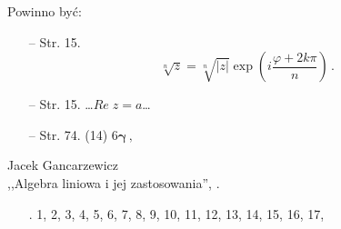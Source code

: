 Powinno być:
\begin{itemize}
\item[--] Str. 15. $$\sqrt[ n ]{ z } = \sqrt[ n ]{ | z | } \exp( i
  \frac{ \varphi + 2 k \pi }{ n } ) \, .$$
\item[--] Str. 15. \ldots $Re \; z = a$\ldots
\item[--] Str. 74. (14) $6 \boldsymbol{ \gamma } \, ,$

\end{itemize}

\begin{center}
  Jacek Gancarzewicz\\
  ,,Algebra liniowa i jej zastosowania'', \cite{Gan04}.
\end{center}

\begin{itemize}
\item[\rmnum1]. 1\cm, 2\cm, 3\cm, 4\cm, 5\cm, 6\cm, 7\cm, 8\cm, 9\cm,
  10\cm, 11\cm, 12\cm, 13\cm, 14\cm, 15\cm, 16\cm, 17\cm,
\end{itemize}


